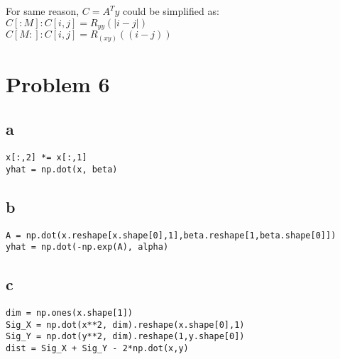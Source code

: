 \documentclass[]{article}
\begin{document}
For same reason, $C = A^Ty$ could be simplified as: \\
$C[:M]: C[i,j] = R_{yy}(|i-j|)$\\
$C[M:]: C[i,j] = R_(xy)((i-j))$

\section{Problem 6}
\subsection{a}
\begin{lstlisting}
x[:,2] *= x[:,1]
yhat = np.dot(x, beta) 
\end{lstlisting}

\subsection{b}
\begin{lstlisting}
A = np.dot(x.reshape[x.shape[0],1],beta.reshape[1,beta.shape[0]])
yhat = np.dot(-np.exp(A), alpha)
\end{lstlisting}

\subsection{c}
\begin{lstlisting}
dim = np.ones(x.shape[1])
Sig_X = np.dot(x**2, dim).reshape(x.shape[0],1)
Sig_Y = np.dot(y**2, dim).reshape(1,y.shape[0])
dist = Sig_X + Sig_Y - 2*np.dot(x,y)
\end{lstlisting}
\end{document}
